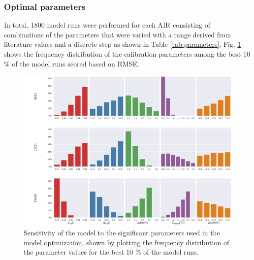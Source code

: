 \documentclass[utf8]{frontiersSCNS} %
\begin{document}
\subsubsection{Optimal parameters}
In total, 1800 model runs were performed for each AIR consisting of combinations of the parameters that were varied with a range
derived from literature values and a discrete step as shown in Table \ref{tab:parameters}. Fig. \ref{fig:param_hist} 
shows the frequency distribution of the calibration parameters among the best 10 \% of the model runs scored based on RMSE.

\begin{figure}
	\begin{center}
		\includegraphics[width=\linewidth]{Figures/param_hist.jpg}
	\end{center}
  \caption{Sensitivity of the model to the significant parameters used in the model optimization, shown by plotting the frequency
distribution of the parameter values for the best 10 \% of the model runs. } \label{fig:param_hist} \end{figure}

\end{document}
